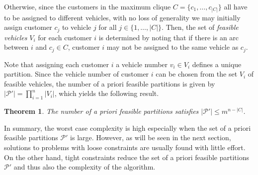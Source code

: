 \documentclass[dissertation,draft*]{aaltoseries}
\newtheorem{theorem}{Theorem}
\begin{document}
Otherwise, since the customers in the maximum clique $C = \{c_1,\ldots,c_{|C|}\}$ all have to be assigned to different vehicles, 
with no loss of generality we may initially assign customer $c_j$ to vehicle $j$ for all $j \in \{1,\ldots,|C|\}$.
Then, the set of \emph{feasible vehicles} $V_i$ for each customer $i$ is determined by noting that if there is an 
arc between $i$ and $c_j \in C$, customer $i$ may not be assigned to the same vehicle as $c_j$.

Note that assigning each customer $i$ a vehicle number $v_i \in V_i$ defines a unique partition.
Since the vehicle number of customer $i$ can be chosen from the set $V_i$ of feasible vehicles, 
the number of a priori feasible partitions is given by $|\mathcal{P}'| = \prod_{i=1}^n |V_i|$, which yields the following result.

\begin{theorem}
\label{partitions}
The number of a priori feasible partitions satisfies $|\mathcal{P}'| \leq m^{n-|C|}$.
\end{theorem}


% 

In summary, the worst case complexity is high especially when the set of a priori feasible partitions $\mathcal{P}'$ is large. 
However, as will be seen in the next section, solutions to problems with loose constraints are usually found with little effort. 
On the other hand, tight constraints reduce the set of a priori feasible partitions $\mathcal{P}'$ 
and thus also the complexity of the algorithm.
\end{document}
